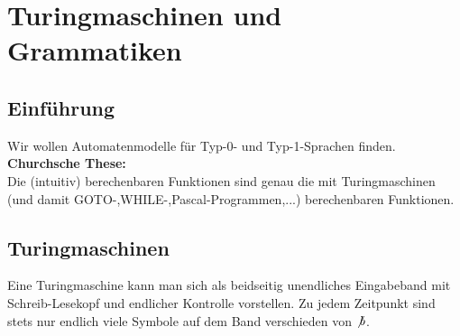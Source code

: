 
\chapter{Turingmaschinen und Grammatiken}

\section{Einführung}

Wir wollen Automatenmodelle für Typ-0- und Typ-1-Sprachen finden.\nl
\textbf{Churchsche These:}\\
Die (intuitiv) berechenbaren Funktionen sind genau die mit Turingmaschinen (und damit GOTO-,WHILE-,Pascal-Programmen,...) berechenbaren Funktionen.

\section{Turingmaschinen}
Eine Turingmaschine kann man sich als beidseitig unendliches Eingabeband mit Schreib-Lesekopf und endlicher Kontrolle vorstellen.
Zu jedem Zeitpunkt sind stets nur endlich viele Symbole auf dem Band verschieden von $\not b$.

